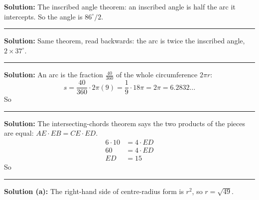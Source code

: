 \documentclass[12pt]{article}
\begin{document}




\textbf{Solution:} The inscribed angle theorem: an inscribed angle is half the arc it intercepts. So the angle is $86^\circ / 2$. 

\vspace{0.2cm}\noindent\rule{\linewidth}{0.2pt}


\textbf{Solution:} Same theorem, read backwards: the arc is twice the inscribed angle, $2 \times 37^\circ$. 

\vspace{0.2cm}\noindent\rule{\linewidth}{0.2pt}


\textbf{Solution:} An arc is the fraction $\frac{40}{360}$ of the whole circumference $2\pi r$:
\[ s = \frac{40}{360}\cdot 2\pi(9) = \frac{1}{9}\cdot 18\pi = 2\pi = 6.2832\ldots \]
So 

\vspace{0.2cm}\noindent\rule{\linewidth}{0.2pt}


\textbf{Solution:} The intersecting-chords theorem says the two products of the pieces are equal: $AE \cdot EB = CE \cdot ED$.
\begin{align*}
  6 \cdot 10 &= 4 \cdot ED \\
  60 &= 4 \cdot ED \\
  ED &= 15
\end{align*}
So 

\vspace{0.2cm}\noindent\rule{\linewidth}{0.2pt}


\textbf{Solution (a):} The right-hand side of centre-radius form is $r^2$, so $r = \sqrt{49}$. 
\end{document}
